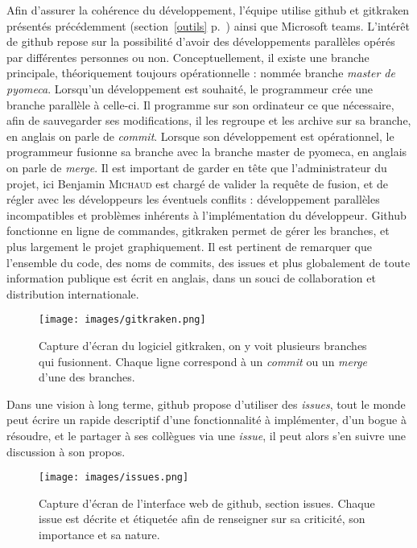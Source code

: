 Afin d'assurer la cohérence du développement, l'équipe utilise github et gitkraken présentés précédemment (section~\ref{outils} p.~\pageref{outils}) ainsi que Microsoft teams.
L’intérêt de \gls{github} repose sur la possibilité d'avoir des développements parallèles opérés par différentes personnes ou non. Conceptuellement, il existe une branche principale, théoriquement toujours opérationnelle : nommée branche \emph{master de pyomeca}. Lorsqu'un développement est souhaité, le programmeur crée une branche parallèle à celle-ci. Il programme sur son ordinateur ce que nécessaire, afin de sauvegarder ses modifications, il les regroupe et les archive sur sa branche, en anglais on parle de \emph{commit}. Lorsque son développement est opérationnel, le programmeur fusionne sa branche avec la branche master de pyomeca, en anglais on parle de \emph{merge}. Il est important de garder en tête que l'administrateur du projet, ici Benjamin \textsc{Michaud} est chargé de valider la requête de fusion, et de régler avec les développeurs les éventuels conflits : développement parallèles incompatibles et problèmes inhérents à l'implémentation du développeur.
Github fonctionne en ligne de commandes, gitkraken permet de gérer les branches, et plus largement le projet graphiquement.
Il est pertinent de remarquer que l'ensemble du code, des noms de commits, des issues et plus globalement de toute information publique est écrit en anglais, dans un souci de collaboration et distribution internationale.


\begin{figure}[ht]
\begin{center}
\texttt{[image: images/gitkraken.png]}
\caption{Capture d'écran du logiciel gitkraken, on y voit plusieurs branches qui fusionnent. Chaque ligne correspond à un \emph{commit} ou un \emph{merge} d'une des branches.}
\end{center}
\end{figure}

Dans une vision à long terme, github propose d'utiliser des \emph{issues}, tout le monde peut écrire un rapide descriptif d'une fonctionnalité à implémenter, d'un bogue à résoudre, et le partager à ses collègues via une \emph{issue}, il peut alors s'en suivre une discussion à son propos.
\newpage
\begin{figure}[H]
\begin{center}
\texttt{[image: images/issues.png]}
\caption{Capture d'écran de l'interface web de github, section issues. Chaque issue est décrite et étiquetée afin de renseigner sur sa criticité, son importance et sa nature.}
\end{center}
\end{figure}

